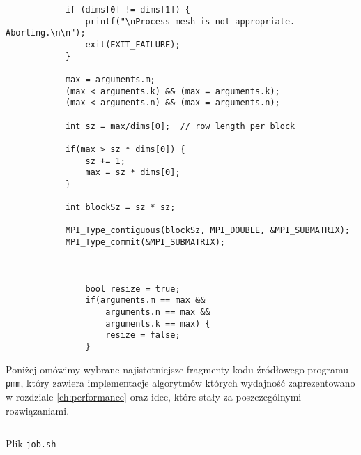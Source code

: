 \begin{listing}
\begin{verbatim}
            if (dims[0] != dims[1]) {
                printf("\nProcess mesh is not appropriate. Aborting.\n\n");
                exit(EXIT_FAILURE);
            }

            max = arguments.m;
            (max < arguments.k) && (max = arguments.k); 
            (max < arguments.n) && (max = arguments.n);

            int sz = max/dims[0];  // row length per block 

            if(max > sz * dims[0]) { 
                sz += 1;
                max = sz * dims[0];
            }

            int blockSz = sz * sz;

            MPI_Type_contiguous(blockSz, MPI_DOUBLE, &MPI_SUBMATRIX);
            MPI_Type_commit(&MPI_SUBMATRIX);



                bool resize = true;
                if(arguments.m == max &&
                    arguments.n == max &&
                    arguments.k == max) {
                    resize = false;
                }
\end{verbatim}
\end{listing}






Poniżej omówimy wybrane najistotniejsze fragmenty kodu źródłowego programu \texttt{pmm}, który zawiera implementacje algorytmów których wydajność zaprezentowano w rozdziale \ref{ch:performance} oraz idee, które stały za poszczególnymi rozwiązaniami. 




\begin{listing}[H]
\footnotesize
\inputminted{bash}{includes/listings/job.sh}
\caption{Plik \texttt{job.sh}}
\label{l:torque_jobs}
\end{listing}